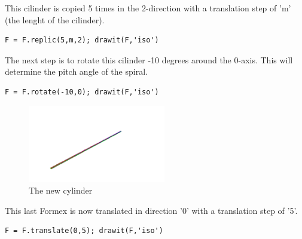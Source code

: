 This cilinder is copied 5 times in the 2-direction with a translation step of 
'm' (the lenght of the cilinder). 
\begin{verbatim}
F = F.replic(5,m,2); drawit(F,'iso')
\end{verbatim}

The next step is to rotate this cilinder -10 degrees around the 0-axis. 
This will determine the pitch angle of the spiral.
\begin{verbatim}
F = F.rotate(-10,0); drawit(F,'iso')
\end{verbatim}
\begin{figure}[ht]
  \centering
  \begin{makeimage}
  \end{makeimage}
  \begin{latexonly}
    \includegraphics[width=6cm]{images/spiral-006}
  \end{latexonly}
  \begin{htmlonly}
  \end{htmlonly}  
  \caption{The new cylinder}
\end{figure}

This last Formex is now translated in direction '0' with a translation step of '5'. 
\begin{verbatim}
F = F.translate(0,5); drawit(F,'iso')
\end{verbatim}

